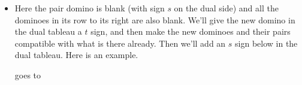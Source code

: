 \documentclass[12pt]{article}
\numberwithin{equation}{section}
\newcommand{\horizontalDominoRSShift}[4]{\filldraw [dominoRSStyle] (#2 - 1 + #4 + \eps, #1 - 1 + \eps) rectangle + (2 - \teps, 1 -\teps) node [dominoText] {$#3$};}
\newcommand{\verticalDominoRSShift}[4]{\filldraw [dominoRSStyle] (#2 - 1 + #4 + \eps,  #1 - 1 + \eps) rectangle + (1 - \teps,2 -\teps) node [dominoText] {$#3$};}
\begin{document}
\begin{itemize}
\begin{itemize}
      \item Here the pair domino is blank (with sign $s$ on the dual side) and all the dominoes in its row to its right are also blank.
      We'll give the new domino in the dual tableau a $t$ sign, and then make the new dominoes and their pairs compatible with what is there already.
      Then we'll add an $s$ sign below in the dual tableau.
      Here is an example.
      \begin{figure}[H]
        \centering
      \end{figure}
      goes to
      \begin{figure}[H]
        \centering
      \end{figure}


\end{itemize}
\end{itemize}
\end{document}
